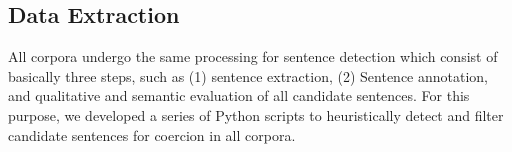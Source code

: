 \documentclass{article}
\begin{document}
\subsection{Data Extraction}
All corpora undergo the same processing for sentence detection which consist of basically three steps, such as (1) sentence extraction, (2) Sentence annotation, and qualitative and semantic evaluation of all candidate sentences. For this purpose, we developed a series of Python scripts to heuristically detect and filter candidate sentences for coercion in all corpora.

\end{document}
